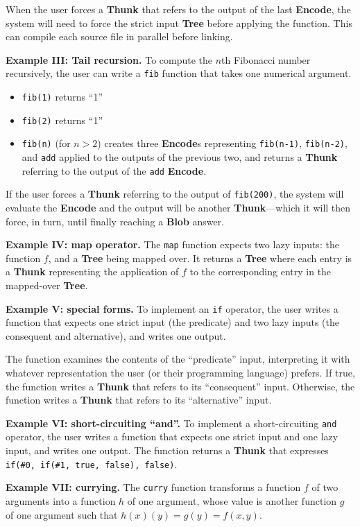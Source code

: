 \documentclass{article}
\newcommand{\blob}{\textbf{Blob}\xspace}
\newcommand{\encode}{\textbf{Encode}\xspace}
\newcommand{\thunk}{\textbf{Thunk}\xspace}
\newcommand{\encodes}{\textbf{Encode}s\xspace}
\newcommand{\tree}{\textbf{Tree}\xspace}
\begin{document}
When the user forces a \thunk that refers to the output of the last \encode, the system will need to force
the strict input \tree before applying the function. This can compile each source file in parallel before linking.

\textbf{Example III: Tail recursion.} To compute the $n$th Fibonacci number
recursively, the user can write a \texttt{fib} function that
takes one numerical argument.
\begin{itemize}[topsep=0pt]
\item \texttt{fib(1)} returns ``1''
\item \texttt{fib(2)} returns ``1''
  \item \texttt{fib(n)} (for $n>2$) creates three \encodes
    representing \texttt{fib(n-1)}, \texttt{fib(n-2)}, and
    \texttt{add} applied to the outputs of the previous two, and
    returns a \thunk referring to the output of the \texttt{add}
    \encode.
    \end{itemize}

If the user forces a \thunk referring to the output of \texttt{fib(200)}, the system will
evaluate the \encode and the output will be another \thunk---which it will then force, in turn,
until finally reaching a \blob answer.

\textbf{Example IV: map operator.} The \texttt{map} function expects
two lazy inputs: the function $f$, and a \tree being mapped over.  It
returns a \tree where each entry is a \thunk representing the application of $f$ to the corresponding
entry in the mapped-over \tree.

\textbf{Example V: special forms.} To implement an \texttt{if}
operator, the user writes a function that expects one strict
input (the predicate) and two lazy inputs (the consequent and
alternative), and writes one output.

The function examines the contents of the ``predicate'' input,
interpreting it with whatever representation the user (or their
programming language) prefers. If true, the function writes a \thunk
that refers to its ``consequent'' input. Otherwise, the function
writes a \thunk that refers to its ``alternative'' input.

\textbf{Example VI: short-circuiting ``and''.} To implement a
short-circuiting \texttt{and} operator, the user writes a function
that expects one strict input and one lazy input, and writes
one output. The function returns a \thunk that expresses \texttt{if(\#0,
  if(\#1, true, false), false)}.

\textbf{Example VII: currying.} The \texttt{curry} function transforms
a function $f$ of two arguments into a function $h$ of one argument,
whose value is another function $g$ of one argument such that $h(x)(y) =
g(y) = f(x,y)$.
\end{document}
